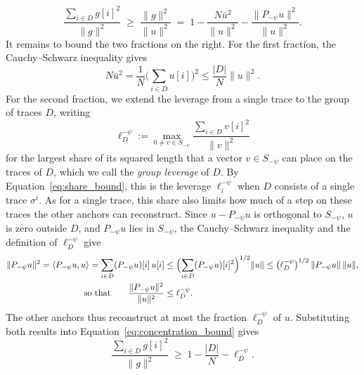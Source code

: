 \documentclass[titlepage,a4paper,11pt]{report}
\begin{document}
    \begin{equation}\label{eq:concentration_bound}
        \frac{\sum_{i\in D}g[i]^2}{\lVert g\rVert^2}\;\ge\;\frac{\lVert g\rVert^2}{\lVert u\rVert^2}\;=\;1-\frac{N\bar u^2}{\lVert u\rVert^2}-\frac{\lVert P_{-\psi}u\rVert^2}{\lVert u\rVert^2}.
    \end{equation}
    It remains to bound the two fractions on the right. For the first fraction, the Cauchy--Schwarz inequality gives
    \begin{equation*}
        N\bar u^2=\frac1N\bigl(\sum_{i\in D}u[i]\bigr)^2\le\frac{|D|}{N}\lVert u\rVert^2.
    \end{equation*}
    For the second fraction, we extend the leverage from a single trace to the group of traces $D$, writing
    \begin{equation}\label{eq:group_leverage}
        \ell_D^{-\psi}:=\max_{0\neq v\in S_{-\psi}}\frac{\sum_{i\in D}v[i]^2}{\lVert v\rVert^2}
    \end{equation}
    for the largest share of its squared length that a vector $v\in S_{-\psi}$ can place on the traces of $D$, which we call the \emph{group leverage} of $D$. By Equation~\eqref{eq:share_bound}, this is the leverage $\ell_i^{-\psi}$ when $D$ consists of a single trace $\sigma^i$. As for a single trace, this share also limits how much of a step on these traces the other anchors can reconstruct. Since $u-P_{-\psi}u$ is orthogonal to $S_{-\psi}$, $u$ is zero outside $D$, and $P_{-\psi}u$ lies in $S_{-\psi}$, the Cauchy--Schwarz inequality and the definition of $\ell_D^{-\psi}$ give
    \begin{equation}\label{eq:group_reconstruction_bound}
    \begin{split}
        \lVert P_{-\psi}u\rVert^2=\langle P_{-\psi}u,u\rangle=\sum_{i\in D}(P_{-\psi}u)[i]\,u[i]&\le\Bigl(\sum_{i\in D}(P_{-\psi}u)[i]^2\Bigr)^{1/2}\lVert u\rVert\le\bigl(\ell_D^{-\psi}\bigr)^{1/2}\,\lVert P_{-\psi}u\rVert\,\lVert u\rVert,\\
        \text{so that}\qquad\frac{\lVert P_{-\psi}u\rVert^2}{\lVert u\rVert^2}&\le\ell_D^{-\psi}.
    \end{split}
    \end{equation}
    The other anchors thus reconstruct at most the fraction $\ell_D^{-\psi}$ of $u$. Substituting both results into Equation~\eqref{eq:concentration_bound} gives
    \begin{equation}\label{eq:near_redundant_concentration}
        \frac{\sum_{i\in D}g[i]^2}{\lVert g\rVert^2}\;\ge\;1-\frac{|D|}{N}-\ell_D^{-\psi}.
    \end{equation}
    
\end{document}
